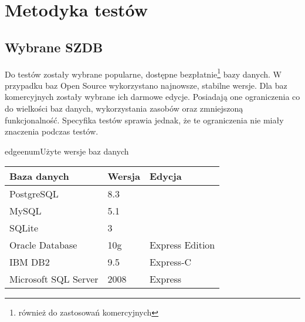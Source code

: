 \chapter{Metodyka testów}

\section{Wybrane SZDB}

Do testów zostały wybrane popularne, dostępne bezpłatnie\footnote{również do zastosowań komercyjnych} bazy danych. 
W przypadku baz Open Source wykorzystano najnowsze, stabilne wersje.
Dla baz komercyjnych zostały wybrane ich darmowe edycje. 
Posiadają one ograniczenia co do wielkości baz danych, wykorzystania zasobów oraz zmniejszoną funkcjonalność. 
Specyfika testów sprawia jednak, że te ograniczenia nie miały znaczenia podczas testów.



\begin{qxtab}{edgeenum}{Użyte wersje baz danych}
\begin{tabular}{l|l|l}
Baza danych                            & Wersja & Edycja \\
\hline
PostgreSQL\index{PostgreSQL}           &  8.3   & \\
MySQL\index{MySQL}                     &  5.1   & \\
SQLite\index{SQLite}                   &  3     & \\
Oracle Database\index{Oracle}          &  10g   & Express Edition \\
IBM DB2\index{IBM DB2}                 &  9.5   & Express-C \\
Microsoft SQL Server\index{SQL Server} &  2008  & Express\\
\end{tabular} 
\end{qxtab}



